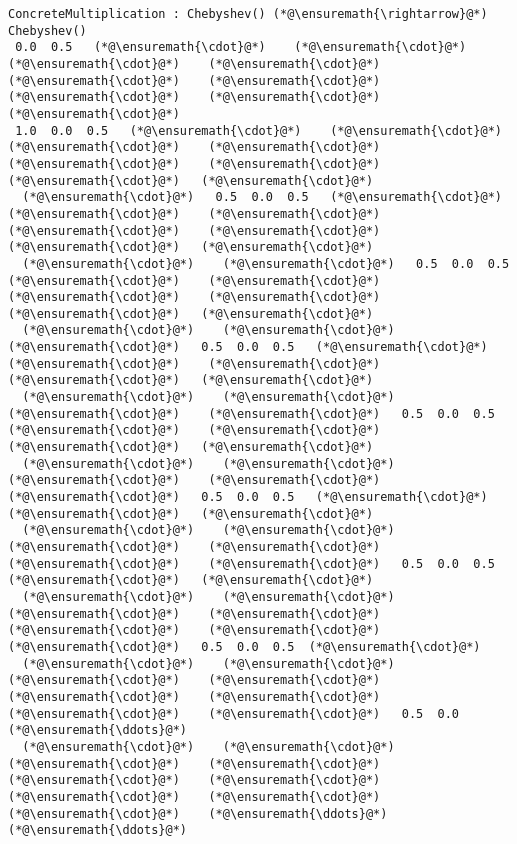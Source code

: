 \documentclass[12pt,landscape]{article}
\begin{document}
{\begin{lstlisting}
ConcreteMultiplication : Chebyshev() (*@\ensuremath{\rightarrow}@*) Chebyshev()
 0.0  0.5   (*@\ensuremath{\cdot}@*)    (*@\ensuremath{\cdot}@*)    (*@\ensuremath{\cdot}@*)    (*@\ensuremath{\cdot}@*)    (*@\ensuremath{\cdot}@*)    (*@\ensuremath{\cdot}@*)    (*@\ensuremath{\cdot}@*)    (*@\ensuremath{\cdot}@*)   (*@\ensuremath{\cdot}@*)
 1.0  0.0  0.5   (*@\ensuremath{\cdot}@*)    (*@\ensuremath{\cdot}@*)    (*@\ensuremath{\cdot}@*)    (*@\ensuremath{\cdot}@*)    (*@\ensuremath{\cdot}@*)    (*@\ensuremath{\cdot}@*)    (*@\ensuremath{\cdot}@*)   (*@\ensuremath{\cdot}@*)
  (*@\ensuremath{\cdot}@*)   0.5  0.0  0.5   (*@\ensuremath{\cdot}@*)    (*@\ensuremath{\cdot}@*)    (*@\ensuremath{\cdot}@*)    (*@\ensuremath{\cdot}@*)    (*@\ensuremath{\cdot}@*)    (*@\ensuremath{\cdot}@*)   (*@\ensuremath{\cdot}@*)
  (*@\ensuremath{\cdot}@*)    (*@\ensuremath{\cdot}@*)   0.5  0.0  0.5   (*@\ensuremath{\cdot}@*)    (*@\ensuremath{\cdot}@*)    (*@\ensuremath{\cdot}@*)    (*@\ensuremath{\cdot}@*)    (*@\ensuremath{\cdot}@*)   (*@\ensuremath{\cdot}@*)
  (*@\ensuremath{\cdot}@*)    (*@\ensuremath{\cdot}@*)    (*@\ensuremath{\cdot}@*)   0.5  0.0  0.5   (*@\ensuremath{\cdot}@*)    (*@\ensuremath{\cdot}@*)    (*@\ensuremath{\cdot}@*)    (*@\ensuremath{\cdot}@*)   (*@\ensuremath{\cdot}@*)
  (*@\ensuremath{\cdot}@*)    (*@\ensuremath{\cdot}@*)    (*@\ensuremath{\cdot}@*)    (*@\ensuremath{\cdot}@*)   0.5  0.0  0.5   (*@\ensuremath{\cdot}@*)    (*@\ensuremath{\cdot}@*)    (*@\ensuremath{\cdot}@*)   (*@\ensuremath{\cdot}@*)
  (*@\ensuremath{\cdot}@*)    (*@\ensuremath{\cdot}@*)    (*@\ensuremath{\cdot}@*)    (*@\ensuremath{\cdot}@*)    (*@\ensuremath{\cdot}@*)   0.5  0.0  0.5   (*@\ensuremath{\cdot}@*)    (*@\ensuremath{\cdot}@*)   (*@\ensuremath{\cdot}@*)
  (*@\ensuremath{\cdot}@*)    (*@\ensuremath{\cdot}@*)    (*@\ensuremath{\cdot}@*)    (*@\ensuremath{\cdot}@*)    (*@\ensuremath{\cdot}@*)    (*@\ensuremath{\cdot}@*)   0.5  0.0  0.5   (*@\ensuremath{\cdot}@*)   (*@\ensuremath{\cdot}@*)
  (*@\ensuremath{\cdot}@*)    (*@\ensuremath{\cdot}@*)    (*@\ensuremath{\cdot}@*)    (*@\ensuremath{\cdot}@*)    (*@\ensuremath{\cdot}@*)    (*@\ensuremath{\cdot}@*)    (*@\ensuremath{\cdot}@*)   0.5  0.0  0.5  (*@\ensuremath{\cdot}@*)
  (*@\ensuremath{\cdot}@*)    (*@\ensuremath{\cdot}@*)    (*@\ensuremath{\cdot}@*)    (*@\ensuremath{\cdot}@*)    (*@\ensuremath{\cdot}@*)    (*@\ensuremath{\cdot}@*)    (*@\ensuremath{\cdot}@*)    (*@\ensuremath{\cdot}@*)   0.5  0.0  (*@\ensuremath{\ddots}@*)
  (*@\ensuremath{\cdot}@*)    (*@\ensuremath{\cdot}@*)    (*@\ensuremath{\cdot}@*)    (*@\ensuremath{\cdot}@*)    (*@\ensuremath{\cdot}@*)    (*@\ensuremath{\cdot}@*)    (*@\ensuremath{\cdot}@*)    (*@\ensuremath{\cdot}@*)    (*@\ensuremath{\cdot}@*)    (*@\ensuremath{\ddots}@*)   (*@\ensuremath{\ddots}@*)
\end{lstlisting}


}
\end{document}

